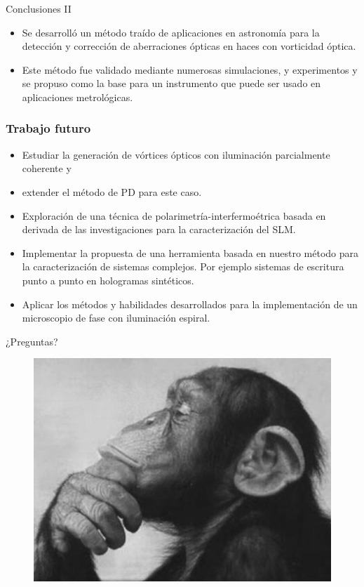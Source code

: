 \documentclass[xcolor=table,serif]{beamer}
\newif\ifplacelogo %
\begin{document}
\begin{frame}{Conclusiones II}
\small
\begin{itemize}
\item Se desarrolló un método traído de aplicaciones
  en astronomía para la detección y corrección de aberraciones ópticas
  en haces con vorticidad óptica.
\pause
\item Este método fue validado mediante numerosas simulaciones, y
  experimentos y se propuso como la base para un instrumento que puede
  ser usado en aplicaciones metrológicas. 
\end{itemize}
\end{frame}

\begin{frame}
  \frametitle{Trabajo futuro}
\begin{itemize}
  \item Estudiar la generación de vórtices ópticos con iluminación
    parcialmente coherente y
 \pause
 \item extender el método de PD para este caso.
 \pause
  \item Exploración de una técnica de polarimetría-interfermoétrica
    basada en derivada de las investigaciones para la caracterización
    del SLM.
 \pause
 \item Implementar la propuesta de una herramienta basada en nuestro
   método para la caracterización de sistemas complejos. Por ejemplo
   sistemas de escritura punto a punto en hologramas sintéticos.
 \pause
 \item Aplicar los métodos y habilidades desarrollados para la
   implementación de un microscopio de fase con iluminación espiral.
\end{itemize}
\end{frame}
\begin{frame}{¿Preguntas?}
  \begin{figure}
    \centering
    \includegraphics[scale=0.5]{Figures/presentation/thinker.jpeg}	
  \end{figure}
\end{frame}
\placelogofalse
\end{document}

